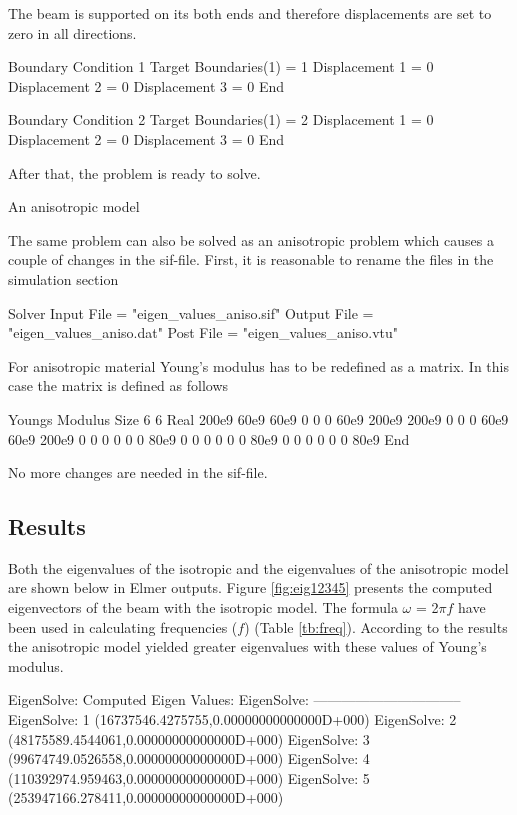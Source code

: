 \begin{flushleft}
The beam is supported on its both ends and therefore displacements are set to zero in all directions.

\ttbegin  
Boundary Condition 1
  Target Boundaries(1) = 1
  Displacement 1 = 0
  Displacement 2 = 0
  Displacement 3 = 0  
End

Boundary Condition 2
  Target Boundaries(1) = 2
  Displacement 1 = 0
  Displacement 2 = 0
  Displacement 3 = 0  
End
\ttend  

After that, the problem is ready to solve.
\linebreak[4]

\begin{bf}
An anisotropic model
\end{bf}
\linebreak[2]

The same problem can also be solved as an anisotropic problem
which causes a couple of changes in the sif-file.
First, it is reasonable to rename the files in the simulation section

\ttbegin
Solver Input File = "eigen_values_aniso.sif"
Output File = "eigen_values_aniso.dat"
Post File = "eigen_values_aniso.vtu"
\ttend

For anisotropic material Young's modulus has to be redefined as a matrix. 
In this case the matrix is defined as follows

\ttbegin
Youngs Modulus
Size 6 6
    Real  200e9  60e9   60e9   0     0     0      
          60e9   200e9  200e9  0     0     0      
          60e9   60e9   200e9  0     0     0      
          0      0      0      80e9  0     0      
          0      0      0      0     80e9  0      
          0      0      0      0     0     80e9   
    End
\ttend

No more changes are needed in the sif-file.

\end{flushleft}
\subsection*{Results}
Both the eigenvalues of the isotropic and the eigenvalues of the anisotropic model are shown below in Elmer outputs. Figure \ref{fig:eig12345} presents the computed eigenvectors of the beam with the isotropic model. The formula $\omega$ = 2$\pi$$f$ have been used in calculating frequencies ($f$)
(Table \ref{tb:freq}).
According to the results the anisotropic model yielded greater eigenvalues with
these values of Young's modulus.  


\ttbegin
EigenSolve: Computed Eigen Values:
EigenSolve: --------------------------------
EigenSolve:            1        (16737546.4275755,0.00000000000000D+000)
EigenSolve:            2        (48175589.4544061,0.00000000000000D+000)
EigenSolve:            3        (99674749.0526558,0.00000000000000D+000)
EigenSolve:            4        (110392974.959463,0.00000000000000D+000)
EigenSolve:            5        (253947166.278411,0.00000000000000D+000)

